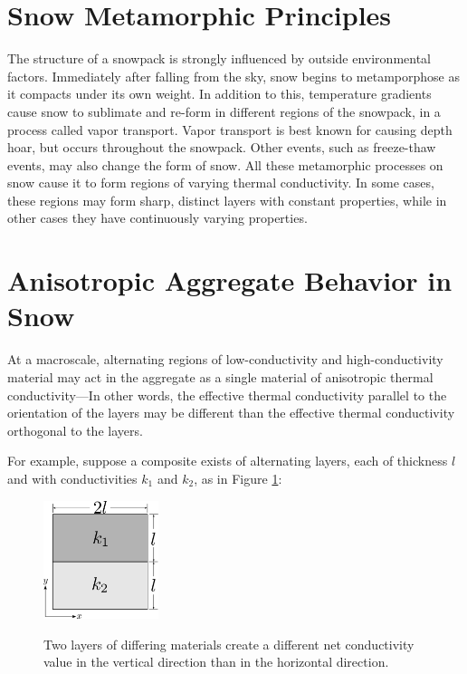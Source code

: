 \section{Snow Metamorphic Principles}
\label{sec:introduction:metamorphic}

The structure of a snowpack is strongly influenced by outside environmental
factors. Immediately after falling from the sky, snow begins to metamporphose as
it compacts under its own weight. In addition to this, temperature gradients
cause snow to sublimate and re-form in different regions of the snowpack, in a
process called vapor transport. Vapor transport is best known for causing
depth hoar, but occurs throughout the snowpack. Other events, such as
freeze-thaw events, may also change the form of snow. All these metamorphic
processes on snow cause it to form regions of varying thermal conductivity. In
some cases, these regions may form sharp, distinct layers with constant
properties, while in other cases they have continuously varying properties.

\section{Anisotropic Aggregate Behavior in Snow}

At a macroscale, alternating regions of low-conductivity and high-conductivity
material may act in the aggregate as a single material of anisotropic thermal
conductivity---In other words, the effective thermal conductivity parallel to
the orientation of the layers may be different than the effective thermal
conductivity orthogonal to the layers.

For example, suppose a composite exists of alternating layers, each of thickness
\(l\) and with conductivities \(k_1\) and \(k_2\), as in Figure
\ref{fig:ex_laminate}:

\begin{figure}[h]
\centering
\includegraphics[width=0.3\textwidth]{fig/ex_laminate.png}
\label{fig:ex_laminate}
\caption{Two layers of differing materials create a different net conductivity value in the vertical direction than in the horizontal direction.}
\end{figure}

